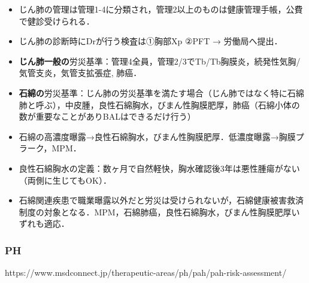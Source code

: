 \begin{itemize}
\item じん肺の管理は管理1-4に分類され，管理2以上のものは健康管理手帳，公費で健診受けられる．
\item じん肺の診断時にDrが行う検査は①胸部Xp ②PFT → 労働局へ提出．
\item \textbf{じん肺一般の}労災基準：管理4全員，管理2/3でTb/Tb胸膜炎，続発性気胸/気管支炎，気管支拡張症, 肺癌．
\item \textbf{石綿の}労災基準：じん肺の労災基準を満たす場合（じん肺ではなく特に石綿肺と呼ぶ），中皮腫，良性石綿胸水，びまん性胸膜肥厚，肺癌（石綿小体の数が重要なことがありBALはできるだけ行う）
\item 石綿の高濃度曝露→良性石綿胸水，びまん性胸膜肥厚．低濃度曝露→胸膜プラーク，MPM．
\item 良性石綿胸水の定義：数ヶ月で自然軽快，胸水確認後3年は悪性腫瘍がない（両側に生じてもOK）．
\item 石綿関連疾患で職業曝露以外だと労災は受けられないが，石綿健康被害救済制度の対象となる．MPM，石綿肺癌，良性石綿胸水，びまん性胸膜肥厚いずれも適応．
\end{itemize}


\subsubsection{PH}{}{https://www.msdconnect.jp/therapeutic-areas/ph/pah/pah-risk-assessment/}


